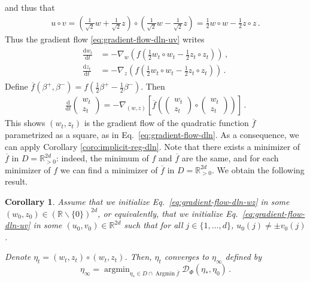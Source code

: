 \documentclass[11pt,reqno]{article}
\DeclareMathOperator*{\argmin}{argmin}
\DeclareMathOperator*{\Argmin}{Argmin}
\newcommand{\diff}{\mathrm{d}}
\newcommand{\R}{\mathbb{R}}
\newcommand{\cD}{\mathcal{D}}
\numberwithin{equation}{section}
\theoremstyle{plain}
\newtheorem{coro}[assumption]{Corollary}
\theoremstyle{definition}
\theoremstyle{remark}
\begin{document}
and thus that 
\begin{align*}
	u \circ v = \left(\frac{1}{\sqrt{2}}w + \frac{1}{\sqrt{2}}z\right) \circ \left(\frac{1}{\sqrt{2}}w - \frac{1}{\sqrt{2}}z\right) = \frac{1}{2} w \circ w - \frac{1}{2} z \circ z \, .
\end{align*}
Thus the gradient flow \eqref{eq:gradient-flow-dln-uv} writes
\begin{align}
	\label{eq:gradient-flow-dln-wz}
	\begin{split}
	\frac{\diff w_t}{\diff t} &= - \nabla_w \left( f\left(\frac{1}{2} w_t \circ w_t - \frac{1}{2} z_t \circ z_t\right) \right) \, , \\
	\frac{\diff z_t}{\diff t} &= - \nabla_z \left( f\left(\frac{1}{2} w_t \circ w_t - \frac{1}{2} z_t \circ z_t\right) \right) \, .
	\end{split}
\end{align}
Define $\overline{f}(\beta^+, \beta^-) = f\left(\frac{1}{2}\beta^+ - \frac{1}{2}\beta^-\right)$. Then 
\begin{align*}
	\frac{\diff }{\diff t} \begin{pmatrix}
		w_t \\ z_t
	\end{pmatrix} = - \nabla_{(w,z)} \left[ \overline{f}\left(\begin{pmatrix}
		w_t \\ z_t
	\end{pmatrix}\circ \begin{pmatrix}
		w_t \\ z_t
	\end{pmatrix}\right) \right] \, . 
\end{align*}
This shows $(w_t, z_t)$ is the gradient flow of the quadratic function $\overline{f}$ parametrized as a square, as in Eq.~\eqref{eq:gradient-flow-dln}. As a consequence, we can apply Corollary \ref{coro:implicit-reg-dln}. Note that there exists a minimizer of $\overline{f}$ in $D = \R_{>0}^{2d}$: indeed, the minimum of $f$ and $\overline{f}$ are the same, and for each minimizer of $f$ we can find a minimizer of $\overline{f}$ in $D = \R_{>0}^{2d}$. We obtain the following result. 

\begin{coro}
Assume that we initialize Eq.~\eqref{eq:gradient-flow-dln-wz} in some $(w_0,z_0) \in (\R\backslash\{0\})^{2d}$, or equivalently, that we initialize Eq.~\eqref{eq:gradient-flow-dln-uv} in some $(u_0,v_0) \in \R^{2d}$ such that for all $j \in \{1,\dots, d\}$, $u_0(j) \neq \pm v_0(j)$. 

Denote $\eta_t = (w_t, z_t) \circ (w_t, z_t)$. Then, $\eta_t$ converges to $\eta_\infty$ defined by
\begin{equation*}
	\eta_\infty = \argmin_{\eta_* \in D \cap \Argmin \overline{f}} \cD_\Phi(\eta_*, \eta_0) \, .
\end{equation*}
\end{coro}
\end{document}

